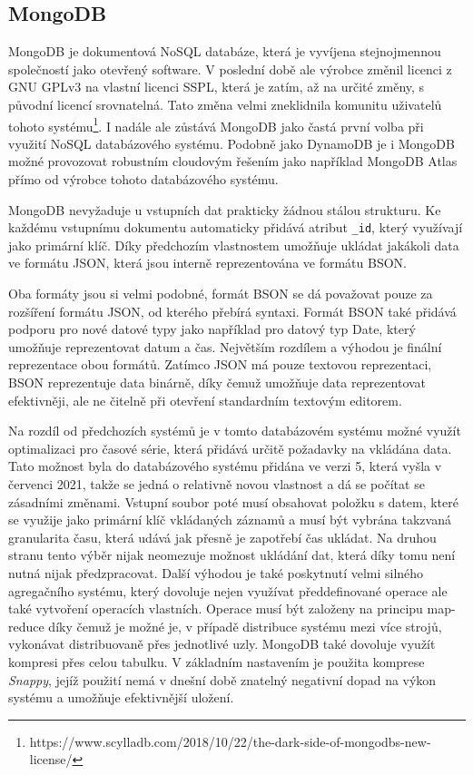 \subsection{MongoDB}
MongoDB je dokumentová NoSQL databáze, která je vyvíjena stejnojmennou společností jako otevřený software. V poslední době ale výrobce změnil licenci z GNU GPLv3 na vlastní licenci SSPL, která je zatím, až na určité změny, s původní licencí srovnatelná. Tato změna velmi zneklidnila komunitu uživatelů tohoto systému\footnote{https://www.scylladb.com/2018/10/22/the-dark-side-of-mongodbs-new-license/}. I nadále ale zůstává MongoDB jako častá první volba při využití NoSQL databázového systému. Podobně jako DynamoDB je i MongoDB možné provozovat robustním cloudovým řešením jako například MongoDB Atlas přímo od výrobce tohoto databázového systému.

MongoDB nevyžaduje u vstupních dat prakticky žádnou stálou strukturu. Ke každému vstupnímu dokumentu automaticky přidává atribut \texttt{\_id}, který využívají jako primární klíč. Díky předchozím vlastnostem umožňuje ukládat jakákoli data ve formátu JSON, která jsou interně reprezentována ve formátu BSON.

Oba formáty jsou si velmi podobné, formát BSON se dá považovat pouze za rozšíření formátu JSON, od kterého přebírá syntaxi. Formát BSON také přidává podporu pro nové datové typy jako například pro datový typ Date, který umožňuje reprezentovat datum a čas. Největším rozdílem a výhodou je finální reprezentace obou formátů. Zatímco JSON má pouze textovou reprezentaci, BSON reprezentuje data binárně, díky čemuž umožňuje data reprezentovat efektivněji, ale ne čitelně při otevření standardním textovým editorem.

Na rozdíl od předchozích systémů je v tomto databázovém systému možné využít optimalizaci pro časové série, která přidává určitě požadavky na vkládána data. Tato možnost byla do databázového systému přidána ve verzi 5, která vyšla v červenci 2021, takže se jedná o relativně novou vlastnost a dá se počítat se zásadními změnami. Vstupní soubor poté musí obsahovat položku s datem, které se využije jako primární klíč vkládaných záznamů a musí být vybrána takzvaná granularita času, která udává jak přesně je zapotřebí čas ukládat. Na druhou stranu tento výběr nijak neomezuje možnost ukládání dat, která díky tomu není nutná nijak předzpracovat. Další výhodou je také poskytnutí velmi silného agregačního systému, který dovoluje nejen využívat předdefinované operace ale také vytvoření operacích vlastních. Operace musí být založeny na principu map-reduce díky čemuž je možné je, v případě distribuce systému mezi více strojů, vykonávat distribuovaně přes jednotlivé uzly. MongoDB také dovoluje využít kompresi přes celou tabulku. V základním nastavením je použita komprese \textit{Snappy}, jejíž použití nemá v dnešní době znatelný negativní dopad na výkon systému a umožňuje efektivnější uložení.

